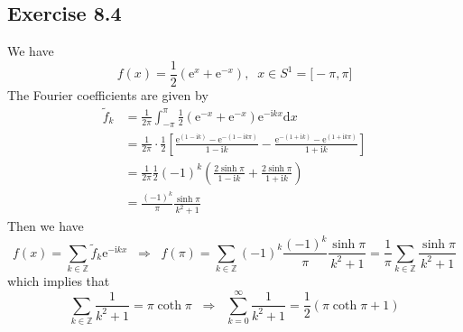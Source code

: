 \documentclass[]{ctexart}
\begin{document}
\subsection{Exercise 8.4}
We have 
\begin{equation*}
f(x)=\frac{1}{2}(\mathrm{e}^x+\mathrm{e}^{-x}),\;\;x\in S^1=\big[-\pi,\pi\big]
\end{equation*}
The Fourier coefficients are given by
\begin{align*}
\tilde{f}_k&=\frac{1}{2\pi}\int_{-\pi}^\pi\frac{1}{2}(\mathrm{e}^{-x}+\mathrm{e}^{-x})\mathrm{e}^{-\mathrm{i}kx}\mathrm{d}x\\
&=\frac{1}{2\pi}\cdot\frac{1}{2}\left[\frac{\mathrm{e}^{(1-\mathrm{i}k)}-\mathrm{e}^{-(1-\mathrm{i}k\pi)}}{1-\mathrm{i}k}-\frac{\mathrm{e}^{-(1+\mathrm{i}k)}-\mathrm{e}^{(1+\mathrm{i}k\pi)}}{1+\mathrm{i}k}\right]\\
&=\frac{1}{2\pi}\frac{1}{2}(-1)^k\left(\frac{2\sinh\pi}{1-\mathrm{i}k}+\frac{2\sinh\pi}{1+\mathrm{i}k}\right)\\
&=\frac{(-1)^k}{\pi}\frac{\sinh\pi}{k^2+1}
\end{align*}
Then we have 
\begin{equation*}
f(x)=\sum_{k\in\mathbb Z}\tilde{f}_k\mathrm{e}^{-\mathrm{i}kx}\;\;\Rightarrow\;\;f(\pi)=\sum_{k\in\mathbb Z}(-1)^k\frac{(-1)^k}{\pi}\frac{\sinh\pi}{k^2+1}=\frac{1}{\pi}\sum_{k\in\mathbb Z}\frac{\sinh\pi}{k^2+1}
\end{equation*}
which implies that 
\begin{equation*}
\sum_{k\in\mathbb Z}\frac{1}{k^2+1}=\pi\coth\pi\;\;\Rightarrow\;\;\sum_{k=0}^\infty\frac{1}{k^2+1}=\frac{1}{2}(\pi\coth\pi+1)
\end{equation*}
\end{document}

